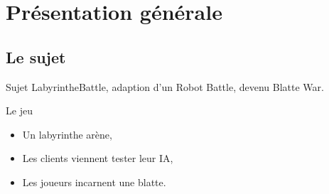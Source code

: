 \section{Présentation générale}

\subsection{Le sujet}

\begin{frame}[c]{\insertsubsection{}}
    \begin{block}{Sujet}
    LabyrintheBattle, adaption d'un Robot Battle, devenu Blatte War.
    \end{block}

    \begin{block}{Le jeu}
        \begin{itemize}
        \item Un labyrinthe arène, 
        \item Les clients viennent tester leur IA,
        \item Les joueurs incarnent une blatte.
        \end{itemize}
    \end{block}
\end{frame}
